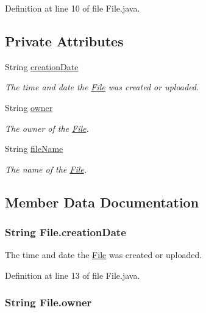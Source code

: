 Definition at line 10 of file File.java.\subsection*{Private Attributes}
\begin{CompactItemize}
\item 
String \hyperlink{classFile_37e5a6249903735c8ac5d5df24d93919}{creationDate}
\begin{CompactList}\small\item\em The time and date the \hyperlink{classFile}{File} was created or uploaded. \item\end{CompactList}\item 
String \hyperlink{classFile_bdc639d45273592da21c8868fd72f569}{owner}
\begin{CompactList}\small\item\em The owner of the \hyperlink{classFile}{File}. \item\end{CompactList}\item 
String \hyperlink{classFile_2bf051a55e4713614282ec0d23137147}{fileName}
\begin{CompactList}\small\item\em The name of the \hyperlink{classFile}{File}. \item\end{CompactList}\end{CompactItemize}


\subsection{Member Data Documentation}
\hypertarget{classFile_37e5a6249903735c8ac5d5df24d93919}{
\subsubsection{\setlength{\rightskip}{0pt plus 5cm}String {\bf File.creationDate}}}
\label{classFile_37e5a6249903735c8ac5d5df24d93919}


The time and date the \hyperlink{classFile}{File} was created or uploaded. 



Definition at line 13 of file File.java.\hypertarget{classFile_bdc639d45273592da21c8868fd72f569}{
\subsubsection{\setlength{\rightskip}{0pt plus 5cm}String {\bf File.owner}}}
\label{classFile_bdc639d45273592da21c8868fd72f569}


